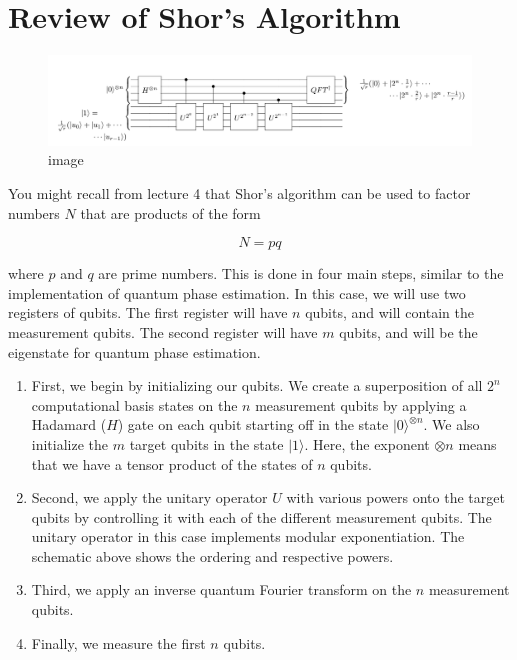 \documentclass[11pt]{article}
\begin{document}
    \hypertarget{review-of-shors-algorithm}{%
\section{Review of Shor's Algorithm}\label{review-of-shors-algorithm}}

    \begin{figure}
\centering
\includegraphics{resources/shor_circuit.png}
\caption{image}
\end{figure}

    You might recall from lecture 4 that Shor's algorithm can be used to
factor numbers \(N\) that are products of the form

\[N = pq\]

where \(p\) and \(q\) are prime numbers. This is done in four main
steps, similar to the implementation of quantum phase estimation. In
this case, we will use two registers of qubits. The first register will
have \(n\) qubits, and will contain the measurement qubits. The second
register will have \(m\) qubits, and will be the eigenstate for quantum
phase estimation.

\begin{enumerate}
\def\labelenumi{\arabic{enumi}.}
\item
  First, we begin by initializing our qubits. We create a superposition
  of all \(2^n\) computational basis states on the \(n\) measurement
  qubits by applying a Hadamard (\(H\)) gate on each qubit starting off
  in the state \(\vert0\rangle^{\otimes n}\). We also initialize the
  \(m\) target qubits in the state \(\vert1\rangle\). Here, the exponent
  \(\otimes n\) means that we have a tensor product of the states of
  \(n\) qubits.
\item
  Second, we apply the unitary operator \(U\) with various powers onto
  the target qubits by controlling it with each of the different
  measurement qubits. The unitary operator in this case implements
  modular exponentiation. The schematic above shows the ordering and
  respective powers.
\item
  Third, we apply an inverse quantum Fourier transform on the \(n\)
  measurement qubits.
\item
  Finally, we measure the first \(n\) qubits.
\end{enumerate}
\end{document}

